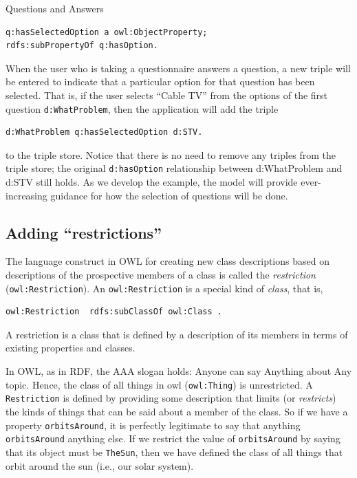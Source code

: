 \begin{example}{Questions and Answers}
\begin{lstlisting}
q:hasSelectedOption a owl:ObjectProperty;
rdfs:subPropertyOf q:hasOption.
\end{lstlisting}

When the user who is taking a questionnaire answers a question, a new
triple will be entered to indicate that a particular option for that
question has been selected. That is, if the user selects ``Cable TV''
from the options of the first question \texttt{d:WhatProblem}, then the
application will add the triple

\begin{lstlisting}
d:WhatProblem q:hasSelectedOption d:STV.
\end{lstlisting}

to the triple store. Notice that there is no need to remove any triples
from the triple store; the original \texttt{d:hasOption} relationship between
d:WhatProblem and d:STV still holds. As we develop the example, the
model will provide ever-increasing guidance for how the selection of
questions will be done.

\end{example}

\subsection{Adding ``restrictions''}

The language construct in OWL for creating new class descriptions based
on descriptions of the prospective members of a class is called the
\emph{restriction} (\texttt{owl:Restriction}). An \texttt{owl:Restriction} is a special kind of
\emph{class}, that is, 

\begin{lstlisting}
owl:Restriction  rdfs:subClassOf owl:Class .
\end{lstlisting}

A restriction is a class that is defined by a description of its members
in terms of existing properties and classes.

In OWL, as in RDF, the AAA slogan holds: Anyone can say Anything about
Any topic. Hence, the class of all things in owl (\texttt{owl:Thing}) is
unrestricted. A \texttt{Restriction} is defined by providing some description
that limits (or \emph{restricts}) the kinds of things that can be said about a
member of the class. So if we have a property \texttt{orbitsAround}, it is
perfectly legitimate to say that anything \texttt{orbitsAround} anything else. If
we restrict the value of \texttt{orbitsAround} by saying that its object must be
\texttt{TheSun}, then we have defined the class of all things that orbit around
the sun (i.e., our solar system).

